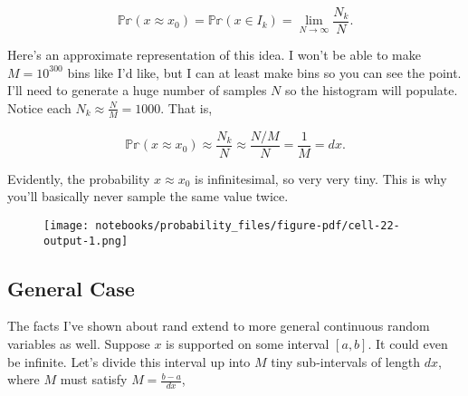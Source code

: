 \documentclass[
  letterpaper,
  DIV=11,
  numbers=noendperiod]{scrreprt}
\newenvironment{Shaded}{\begin{snugshade}}{\end{snugshade}}
\newcommand{\DecValTok}[1]{\textcolor[rgb]{0.68,0.00,0.00}{#1}}
\newcommand{\NormalTok}[1]{\textcolor[rgb]{0.00,0.23,0.31}{#1}}
\newcommand{\OperatorTok}[1]{\textcolor[rgb]{0.37,0.37,0.37}{#1}}
\newcommand{\SpecialCharTok}[1]{\textcolor[rgb]{0.37,0.37,0.37}{#1}}
\newcommand{\SpecialStringTok}[1]{\textcolor[rgb]{0.13,0.47,0.30}{#1}}
\begin{document}
\[\mathbb{Pr}(x \approx x_0) = \mathbb{Pr}(x \in I_k) = \lim_{N \rightarrow \infty} \frac{N_k}{N}.\]

Here's an approximate representation of this idea. I won't be able to
make \(M=10^{300}\) bins like I'd like, but I can at least make bins so
you can see the point. I'll need to generate a huge number of samples
\(N\) so the histogram will populate. Notice each
\(N_k \approx \frac{N}{M} = 1000\). That is,

\[\mathbb{Pr}(x \approx x_0) \approx \frac{N_k}{N} \approx \frac{N/M}{N} = \frac{1}{M} = dx.\]

Evidently, the probability \(x \approx x_0\) is infinitesimal, so very
very tiny. This is why you'll basically never sample the same value
twice.

\begin{Shaded}
\end{Shaded}

\begin{figure}[H]

{\centering \texttt{[image: notebooks/probability\_files/figure-pdf/cell-22-output-1.png]}

}

\end{figure}

\hypertarget{general-case-1}{%
\subsection{General Case}\label{general-case-1}}

The facts I've shown about rand extend to more general continuous random
variables as well. Suppose \(x\) is supported on some interval
\([a,b]\). It could even be infinite. Let's divide this interval up into
\(M\) tiny sub-intervals of length \(dx\), where \(M\) must satisfy
\(M = \frac{b-a}{dx}\),
\end{document}

